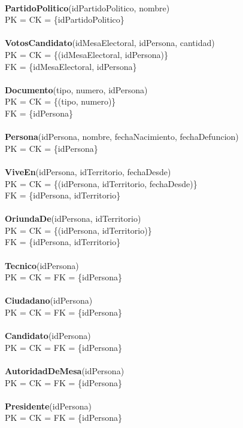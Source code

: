 \\
\textbf{PartidoPolitico}(idPartidoPolitico, nombre)\\
  PK = CK = \{idPartidoPolitico\}\\
\\
\textbf{VotosCandidato}(idMesaElectoral, idPersona, cantidad)\\
  PK = CK = \{(idMesaElectoral, idPersona)\}\\
  FK = \{idMesaElectoral, idPersona\}\\
\\
\textbf{Documento}(tipo, numero, idPersona)\\
  PK = CK = \{(tipo, numero)\}\\
  FK = \{idPersona\}\\
\\
\textbf{Persona}(idPersona, nombre, fechaNacimiento, fechaDefuncion)\\
  PK = CK = \{idPersona\}\\
\\
\textbf{ViveEn}(idPersona, idTerritorio, fechaDesde)\\
  PK = CK = \{(idPersona, idTerritorio, fechaDesde)\}\\
  FK = \{idPersona, idTerritorio\}\\
\\
\textbf{OriundaDe}(idPersona, idTerritorio)\\
  PK = CK = \{(idPersona, idTerritorio)\}\\
  FK = \{idPersona, idTerritorio\}\\
\\
\textbf{Tecnico}(idPersona)\\
  PK = CK = FK = \{idPersona\}\\
\\
\textbf{Ciudadano}(idPersona)\\
  PK = CK = FK = \{idPersona\}\\
\\
\textbf{Candidato}(idPersona)\\
  PK = CK = FK = \{idPersona\}\\
\\
\textbf{AutoridadDeMesa}(idPersona)\\
  PK = CK = FK = \{idPersona\}\\
\\
\textbf{Presidente}(idPersona)\\
  PK = CK = FK = \{idPersona\}\\
\\

